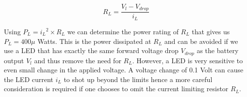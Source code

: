\begin{equation}\label{eq:load}
 R_L = \frac{V_l - V_{drop}}{i_L}
\end{equation}

Using $P_L = {i_L}^2 \times R_L $ we can determine the power rating of $R_L$ that gives us $P_L = 400 \mu$ Watts. This is the power dissipated at $R_L$ and can be avoided if we use a LED that has exactly the same forward voltage drop $V_{drop}$ as the battery output $V_l$ and thus remove the need for $R_L$. However, a LED is very sensitive to even small change in the applied voltage. A voltage change of 0.1 Volt can cause the LED current $i_L$ to shot up beyond the limits hence a more careful consideration is required if one chooses to omit the current limiting resistor $R_L$.
